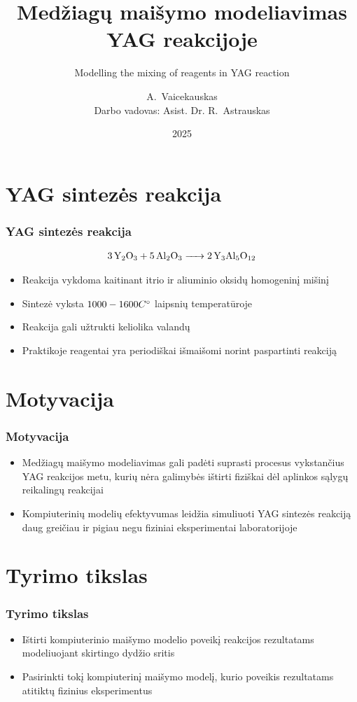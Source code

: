 \documentclass{beamer}
\date{2025}
\title[]{Medžiagų maišymo modeliavimas YAG reakcijoje}
\subtitle{Modelling the mixing of reagents in YAG reaction}
\author[Arnas Vaicekauskas]
{
    A.~Vaicekauskas\inst{1}\\ 
    \small Darbo vadovas: Asist. Dr. R.~Astrauskas\inst{1}
}
\institute[MIF]
{
  \inst{1}
  Matematikos ir informatikos fakultetas\\
  Vilniaus Universitetas
}
\begin{document}
\frame{\titlepage}

\frame{
    \tableofcontents[currentsubsection,subsectionstyle=show]
}

\section{YAG sintezės reakcija}

\begin{frame}
    \frametitle{YAG sintezės reakcija}

    \centering
    \begin{align*}
        \ce{3Y_2O_3 + 5Al_2O_3 -> 2Y_3Al_5O_{12}}
    \end{align*}    

    \begin{itemize}
        \item Reakcija vykdoma kaitinant itrio ir aliuminio oksidų homogeninį mišinį
        \item Sintezė vyksta $1000-1600 C\degree$ laipsnių temperatūroje
        \item Reakcija gali užtrukti keliolika valandų
        \item Praktikoje reagentai yra periodiškai išmaišomi norint paspartinti reakciją 
    \end{itemize}

\end{frame}

\section{Motyvacija}

\begin{frame}
\frametitle{Motyvacija}
 
    \begin{itemize}
        \item Medžiagų maišymo modeliavimas gali padėti suprasti procesus vykstančius YAG reakcijos metu, kurių nėra galimybės ištirti fiziškai dėl aplinkos sąlygų reikalingų reakcijai
        \item Kompiuterinių modelių efektyvumas leidžia simuliuoti YAG sintezės reakciją daug greičiau ir pigiau negu fiziniai eksperimentai laboratorijoje
    \end{itemize}

\end{frame}

\section{Tyrimo tikslas}
\begin{frame}
    \frametitle{Tyrimo tikslas}
    \begin{itemize}
        \item Ištirti kompiuterinio maišymo modelio poveikį reakcijos rezultatams modeliuojant skirtingo dydžio sritis
        \item Pasirinkti tokį kompiuterinį maišymo modelį, kurio poveikis rezultatams atitiktų fizinius eksperimentus
    \end{itemize}
\end{frame}
\end{document}
